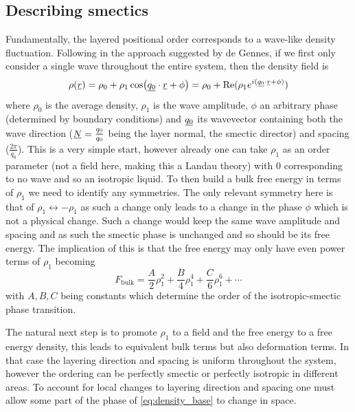 \documentclass[12pt]{article}
\newcommand{\suf}[2]{\stackunder[0.5pt]{\stackunder[1pt]{\ensuremath{#1}}{\rule{\widthof{\ensuremath{#2}}*\real{0.9}}{.1ex}}}{}}
\newcommand{\su}[1]{\suf{#1}{#1}}
\newcommand{\ssu}[1]{\scriptsize\su{#1}\normalsize}
\begin{document}
    \subsection{Describing smectics\cite{oswaldSmecticColumnarLiquid2005}}\label{sec:degennes}
        Fundamentally, the layered positional order corresponds to a wave-like density fluctuation.
        Following \cite{oswaldSmecticColumnarLiquid2005} in the approach suggested by de Gennes, if we first only consider a single wave throughout the entire system, then the density field is
        \begin{equation}\label{eq:density_base}
            \rho(\su{r}) = \rho_0 + \rho_1\cos(\su{q_0}\cdot\su{r} + \phi) = \rho_0 + \Re(\rho_1 e^{i(\ssu{q_0} \cdot \ssu{r} + \phi)})
        \end{equation}
        where $\rho_0$ is the average density, $\rho_1$ is the wave amplitude, $\phi$ an arbitrary phase (determined by boundary conditions) and $\su{q_0}$ its wavevector containing both the wave direction ($\su{N} = \frac{\ssu{q_0}}{q_0}$ being the layer normal, the smectic director) and spacing ($\frac{2\pi}{q_0}$).
        This is a very simple start, however already one can take $\rho_1$ as an order parameter (not a field here, making this a Landau theory) with 0 corresponding to no wave and so an isotropic liquid.
        To then build a bulk free energy in terms of $\rho_1$ we need to identify any symmetries.
        The only relevant symmetry here is that of $\rho_1 \leftrightarrow -\rho_1$ as such a change only leads to a change in the phase $\phi$ which is not a physical change.
        Such a change would keep the same wave amplitude and spacing and as such the smectic phase is unchanged and so should be its free energy.
        The implication of this is that the free energy may only have even power terms of $\rho_1$ becoming
        \begin{equation}
            F_\text{bulk} = \frac{A}{2}\rho_1^2 + \frac{B}{4}\rho_1^4 + \frac{C}{6}\rho_1^6 + \cdots
        \end{equation}
        with $A, B, C$ being constants which determine the order of the isotropic-smectic phase transition\cite{oswaldSmecticColumnarLiquid2005}.

        The natural next step is to promote $\rho_1$ to a field and the free energy to a free energy density, this leads to equivalent bulk terms but also deformation terms.
        In that case the layering direction and spacing is uniform throughout the system, however the ordering can be perfectly smectic or perfectly isotropic in different areas.
        To account for local changes to layering direction and spacing one must allow some part of the phase of \cref{eq:density_base} to change in space.
\end{document}
